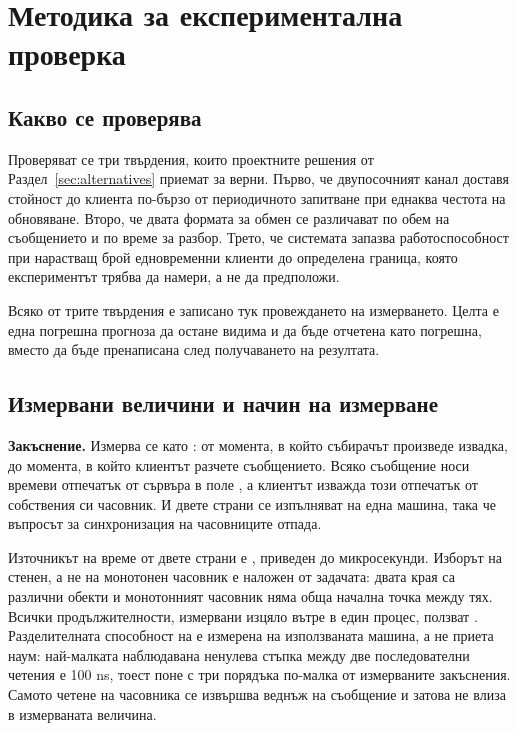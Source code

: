 \section{Методика за експериментална проверка}
\label{sec:method}

\subsection{Какво се проверява}

Проверяват се три твърдения, които проектните решения от Раздел~\ref{sec:alternatives}
приемат за верни. Първо, че двупосочният канал доставя стойност до клиента по-бързо от
периодичното запитване при еднаква честота на обновяване. Второ, че двата формата за обмен
се различават по обем на съобщението и по време за разбор. Трето, че системата запазва
работоспособност при нарастващ брой едновременни клиенти до определена граница, която
експериментът трябва да намери, а не да предположи.

Всяко от трите твърдения е записано тук  провеждането на измерването. Целта е
една погрешна прогноза да остане видима и да бъде отчетена като погрешна, вместо да бъде
пренаписана след получаването на резултата.

\subsection{Измервани величини и начин на измерване}

\textbf{Закъснение.} Измерва се като : от
момента, в който събирачът произведе извадка, до момента, в който клиентът разчете
съобщението. Всяко съобщение носи времеви отпечатък от сървъра в поле , а
клиентът изважда този отпечатък от собствения си часовник. И двете страни се изпълняват на
една машина, така че въпросът за синхронизация на часовниците отпада.

Източникът на време от двете страни е , приведен до
микросекунди. Изборът на стенен, а не на монотонен часовник е наложен от задачата: двата
края са различни обекти и монотонният часовник няма обща начална точка между тях. Всички
продължителности, измервани изцяло вътре в един процес, ползват
. Разделителната способност на  е
измерена на използваната машина, а не приета наум: най-малката наблюдавана ненулева
стъпка между две последователни четения е 100 ns, тоест поне с три порядъка по-малка от
измерваните закъснения. Самото четене на часовника се извършва веднъж на съобщение и
затова не влиза в измерваната величина.

